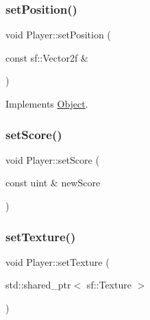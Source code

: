 \subsubsection{\texorpdfstring{setPosition()}{setPosition()}}
{\footnotesize\ttfamily void Player\+::set\+Position (\begin{DoxyParamCaption}\item[{const sf\+::\+Vector2f \&}]{ }\end{DoxyParamCaption})\hspace{0.3cm}{\ttfamily [virtual]}}



Implements \mbox{\hyperlink{class_object_ac5c796bfa75dedf6d3bfc74685b2b77d}{Object}}.

\mbox{\label{class_player_a8053d861a3d9d0f91fd7e35a38e7ce14}} 
\subsubsection{\texorpdfstring{setScore()}{setScore()}}
{\footnotesize\ttfamily void Player\+::set\+Score (\begin{DoxyParamCaption}\item[{const uint \&}]{new\+Score }\end{DoxyParamCaption})\hspace{0.3cm}{\ttfamily [inline]}}

\mbox{\label{class_player_a7f5f3ce419bc062ab59b6f689c24a5a6}} 
\subsubsection{\texorpdfstring{setTexture()}{setTexture()}\hspace{0.1cm}{\footnotesize\ttfamily [1/2]}}
{\footnotesize\ttfamily void Player\+::set\+Texture (\begin{DoxyParamCaption}\item[{std\+::shared\+\_\+ptr$<$ sf\+::\+Texture $>$}]{ }\end{DoxyParamCaption})}

\mbox{\label{class_player_a7d0ef1fb581ee3cc89f85c50c9c2c9ad}} 
